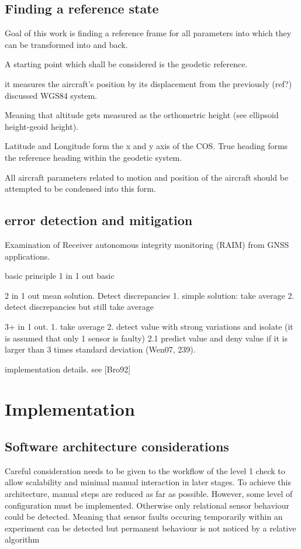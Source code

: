 \section{Finding a reference state}
Goal of this work is finding a reference frame for all parameters into which they can be transformed into and back.

A starting point which shall be considered is the geodetic reference.

it measures the aircraft's position by its displacement from the previously (ref?) discussed WGS84 system.

Meaning that altitude gets measured as the orthometric height (see ellipsoid height-geoid height).

Latitude and Longitude form the x and y axis of the COS. True heading forms the reference heading within the geodetic system.

All aircraft parameters related to motion and position of the aircraft should be attempted to be condensed into this form.


\section{error detection and mitigation}

Examination of Receiver autonomous integrity monitoring (RAIM) from GNSS applications.


basic principle
1 in 1 out
basic


2 in 1 out
mean solution. Detect discrepancies
1. simple solution: take average
2. detect discrepancies but still take average

3+ in 1 out.
1. take average
2. detect value with strong variations and isolate (it is assumed that only 1 sensor is faulty)
2.1 predict value and deny value if it is larger than 3 times standard deviation (Wen07, 239).

implementation details. see [Bro92]


\chapter{Implementation}


\section{Software architecture considerations}

Careful consideration needs to be given to the workflow of the level 1 check to allow scalability and minimal manual interaction in later stages. To achieve this architecture, manual steps are reduced as far as possible. However, some level of configuration must be implemented. Otherwise only relational sensor behaviour could be detected. Meaning that sensor faults occuring temporarily within an experiment can be detected but permanent behaviour is not noticed by a relative algorithm


